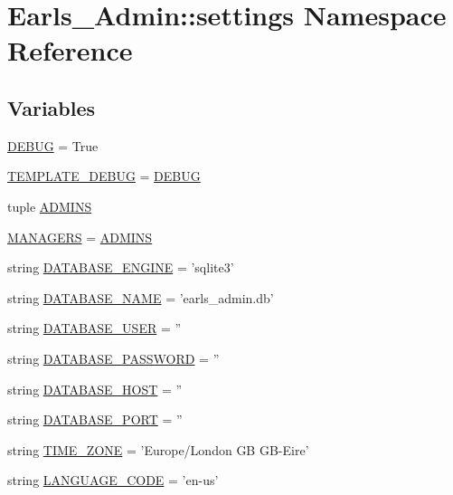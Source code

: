 \hypertarget{namespaceEarls__Admin_1_1settings}{
\section{Earls\_\-Admin::settings Namespace Reference}
\label{namespaceEarls__Admin_1_1settings}
}


\subsection*{Variables}
\begin{CompactItemize}
\item 
\hyperlink{namespaceEarls__Admin_1_1settings_e58131328640fef40d096f0117bc1a1e}{DEBUG} = True
\item 
\hyperlink{namespaceEarls__Admin_1_1settings_f9798dc89daf7ca92cc1e10551a785d7}{TEMPLATE\_\-DEBUG} = \hyperlink{namespaceEarls__Admin_1_1settings_e58131328640fef40d096f0117bc1a1e}{DEBUG}
\item 
tuple \hyperlink{namespaceEarls__Admin_1_1settings_04195fa9f10b3fbebb2ecde7801d761a}{ADMINS}
\item 
\hyperlink{namespaceEarls__Admin_1_1settings_d8e4d0a51872b844355f6abbc0b4955b}{MANAGERS} = \hyperlink{namespaceEarls__Admin_1_1settings_04195fa9f10b3fbebb2ecde7801d761a}{ADMINS}
\item 
string \hyperlink{namespaceEarls__Admin_1_1settings_a0b972de8fdc5f3480cbc0fdce6e6354}{DATABASE\_\-ENGINE} = 'sqlite3'
\item 
string \hyperlink{namespaceEarls__Admin_1_1settings_959098d02bb89997480f506b3487b1a1}{DATABASE\_\-NAME} = 'earls\_\-admin.db'
\item 
string \hyperlink{namespaceEarls__Admin_1_1settings_beb9dcec00dbb396bbb02903cf7a13ac}{DATABASE\_\-USER} = ''
\item 
string \hyperlink{namespaceEarls__Admin_1_1settings_4191bd3300873d52435e869ed50b520d}{DATABASE\_\-PASSWORD} = ''
\item 
string \hyperlink{namespaceEarls__Admin_1_1settings_06af6e2225b0b042f536fc7596fd7f95}{DATABASE\_\-HOST} = ''
\item 
string \hyperlink{namespaceEarls__Admin_1_1settings_5e7ebdbd6adea1299fb1eedd884e4b54}{DATABASE\_\-PORT} = ''
\item 
string \hyperlink{namespaceEarls__Admin_1_1settings_b4ffd6e2c58ff378c9b65257c9d18e86}{TIME\_\-ZONE} = 'Europe/London GB GB-Eire'
\item 
string \hyperlink{namespaceEarls__Admin_1_1settings_b9abde9d8ff66ce6e93a11316b5bc5fb}{LANGUAGE\_\-CODE} = 'en-us'

\end{CompactItemize}
